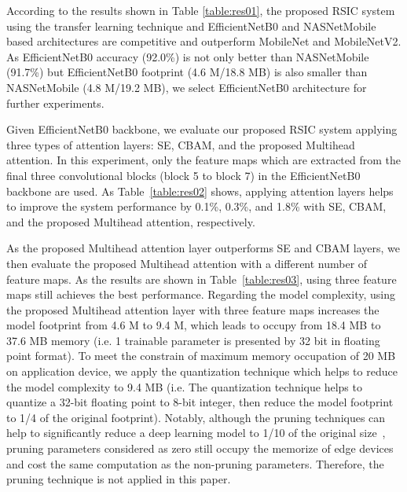 \documentclass[sigconf]{acmart}
\begin{document}
According to the results shown in Table \ref{table:res01}, the proposed RSIC system using the transfer learning technique and EfficientNetB0 and NASNetMobile based architectures are competitive and outperform MobileNet and MobileNetV2.
As EfficientNetB0 accuracy (92.0\%) is not only better than NASNetMobile (91.7\%) but EfficientNetB0 footprint (4.6 M/18.8 MB) is also smaller than NASNetMobile (4.8 M/19.2 MB), we select EfficientNetB0 architecture for further experiments.

Given EfficientNetB0 backbone, we evaluate our proposed RSIC system applying three types of attention layers: SE, CBAM, and the proposed Multihead attention.
In this experiment, only the feature maps which are extracted from the final three convolutional blocks (block 5 to block 7) in the EfficientNetB0 backbone are used. 
As Table~\ref{table:res02} shows, applying attention layers helps to improve the system performance by 0.1\%, 0.3\%, and 1.8\% with SE, CBAM, and the proposed Multihead attention, respectively.

As the proposed Multihead attention layer outperforms SE and CBAM layers, we then evaluate the proposed Multihead attention with a different number of feature maps.
As the results are shown in Table~\ref{table:res03}, using three feature maps still achieves the best performance.
Regarding the model complexity, using the proposed Multihead attention layer with three feature maps increases the model footprint from 4.6 M to 9.4 M, which leads to occupy from 18.4 MB to 37.6 MB memory (i.e. 1 trainable parameter is presented by 32 bit in floating point format).
To meet the constrain of maximum memory occupation of 20 MB on application device, we apply the quantization technique which helps to reduce the model complexity to 9.4 MB (i.e. The quantization technique helps to quantize a 32-bit floating point to 8-bit integer, then reduce the model footprint to 1/4 of the original footprint).
Notably, although the pruning techniques can help to significantly reduce a deep learning model to 1/10 of the original size~\cite{pajusco2020lightweight}, pruning parameters considered as zero still occupy the memorize of edge devices and cost the same computation as the non-pruning parameters.
Therefore, the pruning technique is not applied in this paper.
\end{document}
